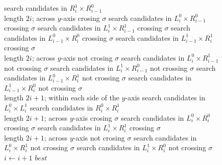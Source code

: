 \documentclass[a4paper,USenglish]{lipics}
\def\best{\mathit{best}}
\begin{document}
\begin{appendix}
\begin{figure}[htb]
\begin{center}
{{\begin{varwidth}{\linewidth}
\begin{codebox}
			\li search candidates in $R^1_i\times R^0_{i-1}$
			\\ \>\> \Comment length $2i$; across $y$-axis crosing $\sigma$
			\li search candidates in $L^0_i\times R^0_{i-1}$ crossing $\sigma$
			\li search candidates in $L^1_i\times R^1_{i-1}$ crossing $\sigma$
			\li search candidates in $L^0_{i-1}\times R^0_{i}$ crossing $\sigma$
			\li search candidates in $L^1_{i-1}\times R^1_{i}$ crossing $\sigma$
			\\ \>\> \Comment length $2i$; across $y$-axis not crosing $\sigma$			
			\li search candidates in $L^0_i\times R^1_{i-1}$ not crossing $\sigma$
			\li search candidates in $L^1_i\times R^0_{i-1}$ not crossing $\sigma$
			\li search candidates in $L^0_{i-1}\times R^1_{i}$ not crossing $\sigma$
			\li search candidates in $L^1_{i-1}\times R^0_{i}$ not crossing $\sigma$
			\\ \>\> \Comment length $2i+1$; within each side of the $y$-axis 
			\li search candidates in $L^0_i\times L^1_{i}$
			\li search candidates in $R^0_i\times R^1_{i}$
			\\ \>\> \Comment length $2i+1$; across $y$-axis crosing $\sigma$
			\li search candidates in $L^0_i\times R^0_{i}$ crossing $\sigma$
			\li search candidates in $L^1_i\times R^1_{i}$ crossing $\sigma$
			\\ \>\> \Comment length $2i+1$; across $y$-axis not crosing $\sigma$			
			\li search candidates in $L^0_i\times R^1_{i}$ not crossing $\sigma$
			\li search candidates in $L^1_i\times R^0_{i}$ not crossing $\sigma$
			\li $i \gets i+1$
			\End
		\End
    \li \Return $\best$
    \\[-2mm]
\end{codebox}
\end{varwidth}~~~~}}
\end{center}
\end{figure}


\end{appendix}
\end{document}
